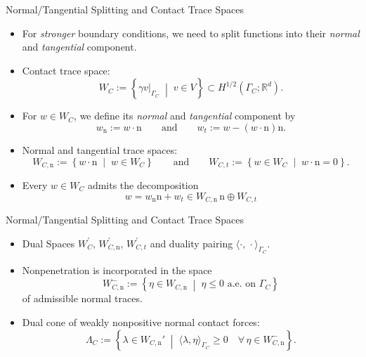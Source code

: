\documentclass[10pt,aspectratio=169]{beamer}
\def\R{{\mathbb R}}
\begin{document}
\begin{frame}{Normal/Tangential Splitting and Contact Trace Spaces}
	\begin{itemize}
		\item For {\em stronger} boundary conditions, we need to split functions into their {\em normal} and {\em tangential} component.
		\item Contact trace space:
		      \begin{equation*}
			      W_C := \left\{\gamma v|_{\Gamma_C}\; \middle|\; v\in V\right\}\subset H^{1/2}(\Gamma_C;\R^d).
		      \end{equation*}
		\item For $w\in W_C$, we define its {\em normal} and {\em tangential} component by
		      \begin{equation*}
			      w_\mathrm{n} := w\cdot \mathrm n
			      \qquad\text{and}\qquad
			      w_t := w - (w\cdot \mathrm n)\mathrm n.
		      \end{equation*}
		\item Normal and tangential trace spaces:
		      \begin{equation*}
			      W_{C,\mathrm{n}} := \left\{w\cdot \mathrm n\; \middle|\; w\in W_C\right\}
			      \qquad\text{and}\qquad
			      W_{C,t} := \left\{w\in W_C\; \middle|\; w\cdot \mathrm n = 0\right\}.
		      \end{equation*}
		\item Every $w\in W_C$ admits the decomposition
		      \begin{equation*}
			      w = w_\mathrm{n}\mathrm n + w_t\in W_{C,\mathrm{n}}\,\mathrm{n}\oplus W_{C,t}
		      \end{equation*}
	\end{itemize}
\end{frame}

\begin{frame}{Normal/Tangential Splitting and Contact Trace Spaces}
	\begin{itemize}
		\item Dual Spaces $W^\prime_C,\, W_{C,\mathrm{n}}^\prime,\,W_{C,t}^\prime$ and duality pairing $\langle\cdot,\,\cdot\rangle_{\Gamma_C}$.
		\item Nonpenetration is incorporated in the space
		      \begin{equation*}
			      W_{C,\mathrm{n}}^-
			      :=
			      \left\{\eta\in W_{C,\mathrm{n}}\; \middle|\; \eta\le 0 \text{ a.e.\ on }\Gamma_C\right\}
		      \end{equation*}
		      of admissible normal traces.
		\item Dual cone of weakly nonpositive normal contact forces:
		      \begin{equation*}
			      \Lambda_C
			      :=
			      \left\{\lambda\in W_{C,\mathrm{n}}'\; \middle|\; \langle \lambda,\eta\rangle_{\Gamma_C} \ge 0 \quad \forall\,\eta\in W_{C,\mathrm{n}}^-\right\}.
		      \end{equation*}
	\end{itemize}
\end{frame}
\end{document}
